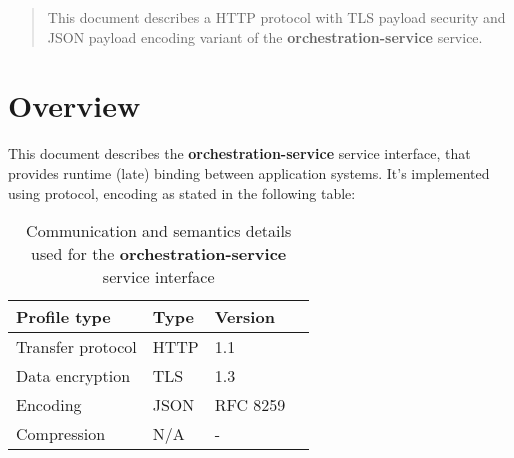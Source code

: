 \documentclass[a4paper]{arrowhead}
\begin{document}
\ArrowheadDate{\today}
\ArrowheadSetup

\begin{center}
  \vspace*{1cm}
  \huge{\arrowtitle}

  \vspace*{0.2cm}
  \LARGE{\arrowtype}
  \vspace*{1cm}
\end{center}

  \vspace*{\fill}


  \vspace*{1cm}
  \vspace*{\fill}

  \begin{abstract}
    This document describes a HTTP protocol with TLS payload
    security and JSON payload encoding variant of the \textbf{orchestration-service} service.
  \end{abstract}
  \vspace*{1cm}

\newpage

\tableofcontents
\newpage

\section{Overview}
\label{sec:overview}

This document describes the \textbf{orchestration-service} service interface, that provides runtime (late) binding between application systems. It's implemented using protocol, encoding as stated in the following table:

\begin{table}[ht!]
  \centering
  \begin{tabular}{|l|l|l|l|}
    \rowcolor{gray!33} Profile type & Type & Version \\ \hline
    Transfer protocol & HTTP & 1.1 \\ \hline
    Data encryption & TLS & 1.3 \\ \hline
    Encoding & JSON & RFC 8259 \cite{rfc8259} \\ \hline
    Compression & N/A & - \\ \hline
  \end{tabular}
  \caption{Communication and semantics details used for the \textbf{orchestration-service}
    service interface}
  \label{tab:comunication_semantics_profile}
\end{table}
\end{document}
